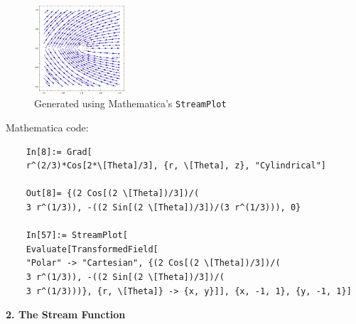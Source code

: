 \documentclass{article}
\theoremstyle{definition}
\begin{document}
\begin{enumerate}[label=(\alph*)]
	\begin{figure}[!htb]
		\centering
		\includegraphics[width=0.3\textwidth]{1c.eps}
		\caption{Generated using Mathematica's \texttt{StreamPlot}}
	\end{figure}
	
	Mathematica code:
	\begin{lstlisting}
	In[8]:= Grad[
	r^(2/3)*Cos[2*\[Theta]/3], {r, \[Theta], z}, "Cylindrical"]
	
	Out[8]= {(2 Cos[(2 \[Theta])/3])/(
	3 r^(1/3)), -((2 Sin[(2 \[Theta])/3])/(3 r^(1/3))), 0}
	
	In[57]:= StreamPlot[
	Evaluate[TransformedField[
	"Polar" -> "Cartesian", {(2 Cos[(2 \[Theta])/3])/(
	3 r^(1/3)), -((2 Sin[(2 \[Theta])/3])/(
	3 r^(1/3)))}, {r, \[Theta]} -> {x, y}]], {x, -1, 1}, {y, -1, 1}]
	\end{lstlisting}
	
	
	
\end{enumerate}

\noindent \textbf{2. The Stream Function}
\end{document}
